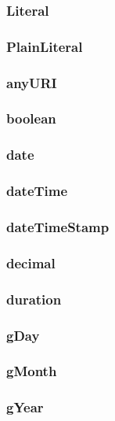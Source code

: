 \documentclass{article}
\begin{document}
\subsubsection*{Literal}

\subsubsection*{PlainLiteral}

\subsubsection*{anyURI}

\subsubsection*{boolean}

\subsubsection*{date}

\subsubsection*{dateTime}

\subsubsection*{dateTimeStamp}

\subsubsection*{decimal}

\subsubsection*{duration}

\subsubsection*{gDay}

\subsubsection*{gMonth}

\subsubsection*{gYear}
\end{document}
